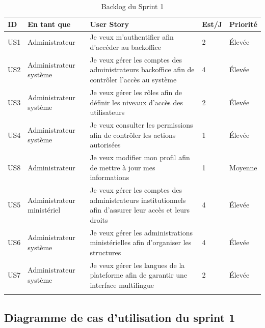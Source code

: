 \begin{longtable}{|p{1cm}|p{3cm}|p{7cm}|p{1cm}|p{2cm}|}

\hline
\rowcolor{orange!30}
\textbf{ID} & \textbf{En tant que} & \textbf{User Story} & \textbf{Est/J} & \textbf{Priorité} \\
\hline
\endfirsthead



US1 & Administrateur &
Je veux m’authentifier afin d’accéder au backoffice &
2 & Élevée \\ \hline

US2 & Administrateur système &
Je veux gérer les comptes des administrateurs backoffice afin de contrôler l’accès au système &
4 & Élevée \\ \hline

US3 & Administrateur système &
Je veux gérer les rôles afin de définir les niveaux d’accès des utilisateurs &
2 & Élevée \\ \hline

US4 & Administrateur système &
Je veux consulter les permissions afin de contrôler les actions autorisées &
1 & Élevée \\ \hline

US8 & Administrateur &
Je veux modifier mon profil afin de mettre à jour mes informations &
1 & Moyenne \\ \hline

US5 & Administrateur ministériel &
Je veux gérer les comptes des administrateurs institutionnels afin d’assurer leur accès et leurs droits &
4 & Élevée \\ \hline

US6 & Administrateur système &
Je veux gérer les administrations ministérielles afin d’organiser les structures &
4 & Élevée \\ \hline

US7 & Administrateur système &
Je veux gérer les langues de la plateforme afin de garantir une interface multilingue &
2 & Élevée \\ \hline

\caption{Backlog du Sprint 1}
\label{tab:user-stories-sprint1}

\end{longtable}





\subsection{Diagramme de cas d’utilisation du sprint 1}

